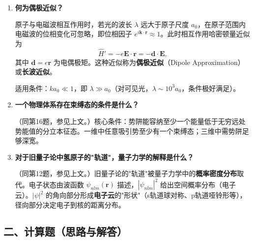 \begin{enumerate}[label=\textbf{\arabic*.}, leftmargin=2em, itemsep=0.8em, resume]
占有数表象（Number Representation）将谐振子的激发量子视为"粒子"（声子或光子），以粒子数算符 $\hat{N} = a^\dagger a$ 的本征态 $|n\rangle$ 作为基矢：
\[
    \hat{N}|n\rangle = n|n\rangle, \quad n = 0,1,2,\dots
\]

产生和湮灭算符的作用：
\[
    a^\dagger|n\rangle = \sqrt{n+1}\,|n+1\rangle,\qquad
    a|n\rangle = \sqrt{n}\,|n-1\rangle.
\]

\textbf{意义}：在二次量子化（多体量子理论）中，占有数表象是描述全同粒子系统的基本语言，直接体现玻色子/费米子的统计性质。

\item \textbf{何为偶极近似？}

原子与电磁波相互作用时，若光的波长 $\lambda$ 远大于原子尺度 $a_0$，在原子范围内电磁波的位相变化可忽略，即位相因子 $e^{i\mathbf{k}\cdot\mathbf{r}} \approx 1$。此时相互作用哈密顿量近似为
\[
    \hat{H}' = -e\mathbf{E}\cdot\mathbf{r} = -\mathbf{d}\cdot\mathbf{E},
\]
其中 $\mathbf{d} = e\mathbf{r}$ 为电偶极矩。这种近似称为\textbf{偶极近似}（Dipole Approximation）或\textbf{长波近似}。

适用条件：$ka_0 \ll 1$，即 $\lambda \gg a_0$（对可见光，$\lambda \sim 10^3 a_0$，条件极好满足）。

\item \textbf{一个物理体系存在束缚态的条件是什么？}

（同第16题，参见上文。）核心条件：势阱能容纳至少一个能量低于无穷远处势能值的分立本征态。一维中任意吸引势至少有一个束缚态；三维中需势阱足够深宽。

\item \textbf{对于旧量子论中氢原子的"轨道"，量子力学的解释是什么？}

（同第12题，参见上文。）旧量子论的"轨道"被量子力学中的\textbf{概率密度分布}取代。电子状态由波函数 $\psi_{nlm}(\mathbf{r})$ 描述，$|\psi_{nlm}|^2$ 给出空间概率分布（电子云）。$|\psi|^2$ 的角向部分形成\textbf{电子云}的"形状"（s轨道球对称、p轨道哑铃形等），径向部分决定电子到核的距离分布。

\end{enumerate}

\vspace{1em}
\subsection{二、计算题（思路与解答）}

